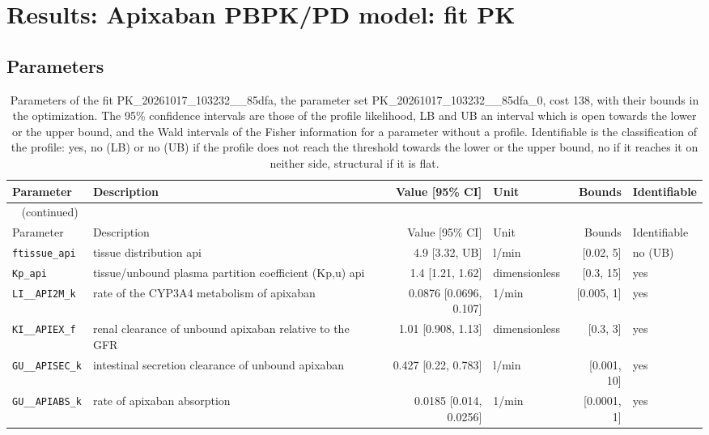 \documentclass{article}
\begin{document}
\section{Results: Apixaban PBPK/PD model: fit PK}

\subsection{Parameters}

\begin{longtable}{llrlrl}
\caption{Parameters of the fit PK\_20261017\_103232\_\_85dfa, the parameter set PK\_20261017\_103232\_\_85dfa\_0, cost 138, with their bounds in the optimization. The 95\% confidence intervals are those of the profile likelihood, LB and UB an interval which is open towards the lower or the upper bound, and the Wald intervals of the Fisher information for a parameter without a profile. Identifiable is the classification of the profile: yes, no (LB) or no (UB) if the profile does not reach the threshold towards the lower or the upper bound, no if it reaches it on neither side, structural if it is flat.}\label{tab:parameters:PK_20261017_103232__85dfa} \\
\toprule
Parameter & Description & Value [95\% CI] & Unit & Bounds & Identifiable \\
\midrule
\endfirsthead
\multicolumn{6}{l}{\small\tablename~\thetable{} (continued)} \\
\toprule
Parameter & Description & Value [95\% CI] & Unit & Bounds & Identifiable \\
\midrule
\endhead
\bottomrule
\endlastfoot
\texttt{ftissue\_api} & tissue distribution api & 4.9 [3.32, UB] & l/min & [0.02, 5] & no (UB) \\
\texttt{Kp\_api} & tissue/unbound plasma partition coefficient (Kp,u) api & 1.4 [1.21, 1.62] & dimensionless & [0.3, 15] & yes \\
\texttt{LI\_\_API2M\_k} & rate of the CYP3A4 metabolism of apixaban & 0.0876 [0.0696, 0.107] & 1/min & [0.005, 1] & yes \\
\texttt{KI\_\_APIEX\_f} & renal clearance of unbound apixaban relative to the GFR & 1.01 [0.908, 1.13] & dimensionless & [0.3, 3] & yes \\
\texttt{GU\_\_APISEC\_k} & intestinal secretion clearance of unbound apixaban & 0.427 [0.22, 0.783] & l/min & [0.001, 10] & yes \\
\texttt{GU\_\_APIABS\_k} & rate of apixaban absorption & 0.0185 [0.014, 0.0256] & 1/min & [0.0001, 1] & yes \\

\end{longtable}
\end{document}
